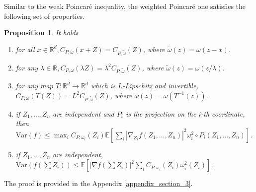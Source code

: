 \documentclass[11pt,reqno]{amsart}
\numberwithin{equation}{section}
\newtheorem{proposition}[theorem]{Proposition}
\theoremstyle{definition}
\theoremstyle{remark}
\def \Var {\textrm{Var}}
\begin{document}
Similar to the weak Poincar\'e inequality, the weighted Poincar\'e one satisfies the following set of properties.
\begin{proposition}\label{propweightedPIproperties}
    It holds
    \begin{enumerate}
        \item[(1)] for all $x\in\mathbb{R}^d, C_{P,\omega}(x+Z) = C_{P,\tilde\omega}(Z)$, where $\tilde \omega(z) = \omega(z-x)$.
        \item[(2)] for any $\lambda\in\mathbb{R}, C_{P,\omega}(\lambda Z) = \lambda^2C_{P,\tilde\omega}(Z)$, where $\tilde \omega(z) = \omega(z/\lambda)$.
        \item [(3)] for any map $T:\mathbb{R}^d\to\mathbb{R}^d$ which is $L$-Lipschitz and invertible, $C_{P,\omega}(T(Z)) = L^2C_{P,\tilde\omega}(Z)$, where $\tilde \omega(z) = \omega(T^{-1}(z))$.
        \item[(4)] if $Z_1, \dots, Z_n$ are independent and $P_i$ is the projection on the $i$-th coordinate, then $\Var\left(f\right)\leq \max_iC_{P,\omega_i}(Z_i)\mathbb{E}\left[\sum_i\left\vert \nabla_{Z_i} f\left( Z_1,\dots, Z_n\right)\right\vert^2\omega_i^2\circ P_i(Z_1, \dots, Z_n)\right]$.
        \item[(5)] if $Z_1, \dots, Z_n$ are independent, $\Var\left(f\left(\sum Z_i\right)\right)\leq\mathbb{E}\left[\left\vert \nabla f\left(\sum Z_i\right)\right\vert^2\sum_{i} C_{P, \omega_i}(Z_i)\omega_i^2(Z_i)\right]$.
    \end{enumerate}
\end{proposition}
The proof is provided in the Appendix \ref{appendix_section_3}.
\end{document}
